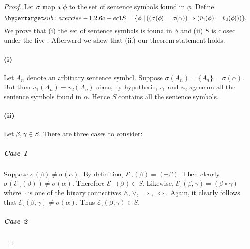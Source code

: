 \documentclass{report}
\begin{document}
  \begin{proof}

    Let $\sigma$ map a  $\phi$ to the set of
      sentence symbols found in $\phi$.
    Define
      \begin{equation}
        \hyperlabel{sub:exercise-1.2.6a-eq1}
        S = \{\phi \mid ((\sigma(\phi) = \sigma(\alpha)) \Rightarrow
          (\bar{v}_1(\phi) = \bar{v}_2(\phi)))\}.
      \end{equation}
    We prove that (i) the set of sentence symbols is found in $\phi$ and (ii)
      $S$ is closed under the five .
    Afterward we show that (iii) our theorem statement holds.

    \paragraph{(i)}%

      Let $A_n$ denote an arbitrary sentence symbol.
      Suppose $\sigma(A_n) = \{A_n\} = \sigma(\alpha)$.
      But then $\bar{v}_1(A_n) = \bar{v}_2(A_n)$ since, by hypothesis, $v_1$
        and $v_2$ agree on all the sentence symbols found in $\alpha$.
      Hence $S$ contains all the sentence symbols.

    \paragraph{(ii)}%

      Let $\beta, \gamma \in S$.
      There are three cases to consider:

      \subparagraph{Case 1}%

        Suppose $\sigma(\beta) \neq \sigma(\alpha)$.
        By definition, $\mathcal{E}_{\neg}(\beta) = (\neg\beta)$.
        Then clearly $\sigma(\mathcal{E}_{\neg}(\beta)) \neq \sigma(\alpha)$.
        Therefore $\mathcal{E}_{\neg}(\beta) \in S$.
        Likewise,
          $\mathcal{E}_{\square}(\beta, \gamma) =
            (\beta \mathop{\square} \gamma)$
          where $\square$ is one of the binary connectives $\land$, $\lor$,
            $\Rightarrow$, $\Leftrightarrow$.
        Again, it clearly follows that
          $\mathcal{E}_{\square}(\beta, \gamma) \neq \sigma(\alpha)$.
        Thus $\mathcal{E}_{\square}(\beta, \gamma) \in S$.

      \subparagraph{Case 2}%


\end{proof}
\end{document}
